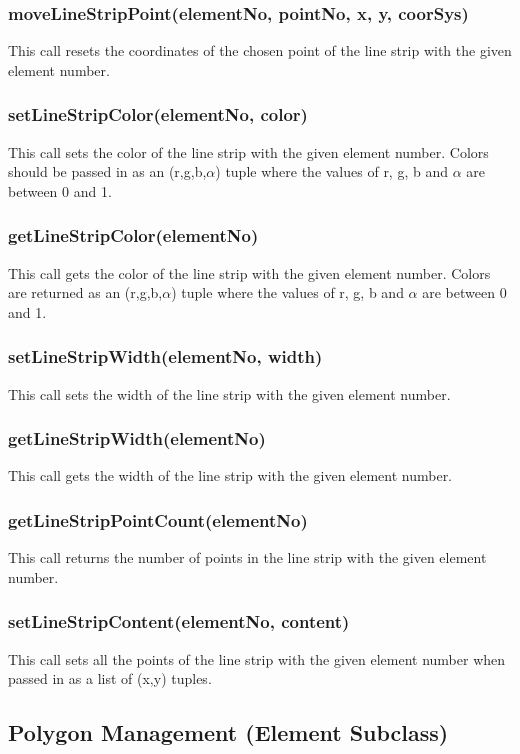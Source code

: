 \documentclass{acm_proc_article-sp}
\begin{document}
\subsubsection{moveLineStripPoint(elementNo, pointNo, x, y, coorSys)}
This call resets the coordinates of the chosen point of the line strip with the given element number.
\subsubsection{setLineStripColor(elementNo, color)}
This call sets the color of the line strip with the given element number. Colors should be passed in as an (r,g,b,$\alpha$) tuple where the values of r, g, b and $\alpha$ are between 0 and 1.
\subsubsection{getLineStripColor(elementNo)}
This call gets the color of the line strip with the given element number. Colors are returned as an (r,g,b,$\alpha$) tuple where the values of r, g, b and $\alpha$ are between 0 and 1.
\subsubsection{setLineStripWidth(elementNo, width)}
This call sets the width of the line strip with the given element number.
\subsubsection{getLineStripWidth(elementNo)}
This call gets the width of the line strip with the given element number.
\subsubsection{getLineStripPointCount(elementNo)}
This call returns the number of points in the line strip with the given element number.
\subsubsection{setLineStripContent(elementNo, content)}
This call sets all the points of the line strip with the given element number when passed in as a list of (x,y) tuples.
\subsection{Polygon Management (Element Subclass)}
\end{document}
